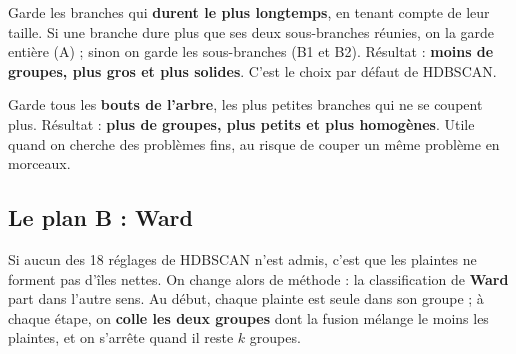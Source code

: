 \begin{tcbraster}[raster columns=2, raster equal height, raster column skip=8pt, raster every box/.style={unbreakable}]
\begin{conceptbox}[title={\faTree\ \texttt{eom} : \og excess of mass \fg}, unbreakable]
\small Garde les branches qui \textbf{durent le plus longtemps}, en tenant compte de leur taille. Si une
branche dure plus que ses deux sous-branches réunies, on la garde entière (A) ; sinon on garde les
sous-branches (B1 et B2). Résultat : \textbf{moins de groupes, plus gros et plus solides}. C'est le choix
par défaut de HDBSCAN.
\end{conceptbox}
\begin{conceptbox}[title={\faLeaf\ \texttt{leaf} : les feuilles}, unbreakable]
\small Garde tous les \textbf{bouts de l'arbre}, les plus petites branches qui ne se coupent plus.
Résultat : \textbf{plus de groupes, plus petits et plus homogènes}. Utile quand on cherche des
problèmes fins, au risque de couper un même problème en morceaux.
\end{conceptbox}
\end{tcbraster}


\subsection{Le plan B : Ward}

Si aucun des 18 réglages de HDBSCAN n'est admis, c'est que les plaintes ne forment pas d'îles nettes.
On change alors de méthode : la classification de \textbf{Ward} part dans l'autre sens. Au début, chaque
plainte est seule dans son groupe ; à chaque étape, on \textbf{colle les deux groupes} dont la fusion
mélange le moins les plaintes, et on s'arrête quand il reste $k$ groupes.

